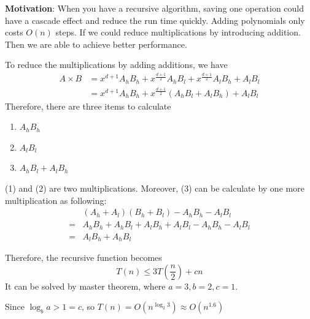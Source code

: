 \textbf{Motivation}: When you have a recursive algorithm, saving  one operation 
could have a cascade effect and reduce the run time quickly. Adding polynomials 
only costs $O(n)$ steps. If we could reduce multiplications by introducing 
addition. Then we are able to achieve better performance. 

To reduce the multiplications by adding additions, we have
\begin{align*}
 A \times B &= x^{d+1}A_h B_h + x^{\frac{d+1}{2}}A_h B_l + x^{\frac{d+1}{2}}A_l 
B_h + A_lB_l\\
            &= x^{d+1}A_h B_h + x^{\frac{d+1}{2}}(A_h B_l + A_l B_h) + A_l 
B_l
\end{align*}
Therefore, there are three items to calculate
\begin{enumerate}[(1)]
 \item $A_h B_h$
 \item $A_l B_l$
 \item $A_h B_l + A_l B_h$
\end{enumerate}
(1) and (2) are two multiplications. Moreover, (3) can be calculate by one more 
multiplication as following:
\begin{align*}
 &  (A_h + A_l) (B_h + B_l) - A_h B_h - A_l B_l\\
 =& A_hB_h + A_hB_l + A_lB_h + A_lB_l - A_h B_h - A_l B_l\\
 =& A_lB_h + A_hB_l
\end{align*}

Therefore, the recursive function becomes
\[T(n) \le 3T(\frac{n}{2}) + cn\]
It can be solved by master theorem, where $a = 3, b = 2, c = 1$.

Since $\log_ba > 1 = c$, so $T(n) = O(n^{\log_2 3}) \approx O(n^{1.6})$